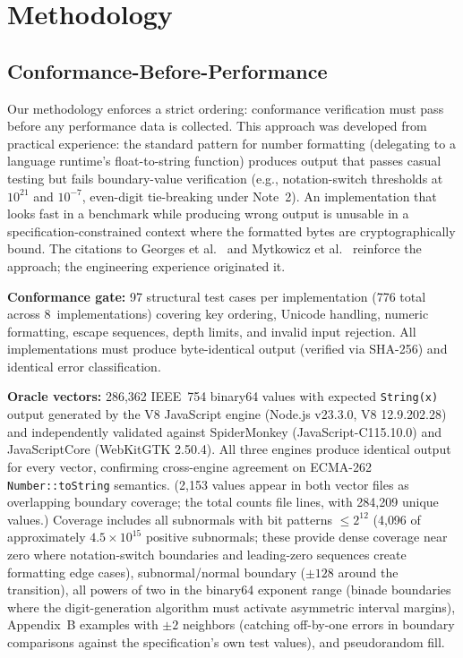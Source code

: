 \section{Methodology}
\label{sec:methodology}

\subsection{Conformance-Before-Performance}

Our methodology enforces a strict ordering: conformance verification
must pass before any performance data is collected.  This approach was
developed from practical experience: the standard pattern for \rfcjcs
number formatting (delegating to a language runtime's float-to-string
function) produces output that passes casual testing but fails \ecma
boundary-value verification (e.g., notation-switch thresholds at
$10^{21}$ and $10^{-7}$, even-digit tie-breaking under Note~2).  An
implementation that looks fast in a benchmark while producing wrong
output is unusable in a specification-constrained context
where the formatted bytes are cryptographically bound.  The citations
to Georges et al.~\cite{georges2007statistically} and Mytkowicz et
al.~\cite{mytkowicz2009producing} reinforce the approach; the
engineering experience originated it.

\textbf{Conformance gate:} 97 structural test cases per implementation
(776 total across 8~implementations) covering key ordering, Unicode
handling, numeric formatting, escape sequences, depth limits, and
invalid input rejection.  All implementations must produce byte-identical
output (verified via SHA-256) and identical error classification.

\textbf{Oracle vectors:} 286{,}362 IEEE~754 binary64 values with
expected \texttt{String(x)} output generated by the V8 JavaScript engine
(Node.js v23.3.0, V8 12.9.202.28) and independently validated against
SpiderMonkey (JavaScript-C115.10.0) and JavaScriptCore (WebKitGTK
2.50.4).  All three engines produce identical output for every vector,
confirming cross-engine agreement on ECMA-262 \texttt{Number::toString}
semantics.
(2{,}153 values appear in both vector files as overlapping boundary
coverage; the total counts file lines, with 284{,}209 unique values.)
Coverage includes all subnormals
with bit patterns $\leq 2^{12}$ (4{,}096 of approximately $4.5 \times 10^{15}$
positive subnormals; these provide dense coverage near zero where
notation-switch boundaries and leading-zero sequences create formatting
edge cases), subnormal/normal boundary ($\pm128$ around the transition),
all powers of two in the binary64 exponent range (binade boundaries
where the digit-generation algorithm must activate asymmetric interval
margins), \rfcjcs Appendix~B examples with $\pm2$ neighbors (catching
off-by-one errors in boundary comparisons against the specification's
own test values), and pseudorandom fill.

